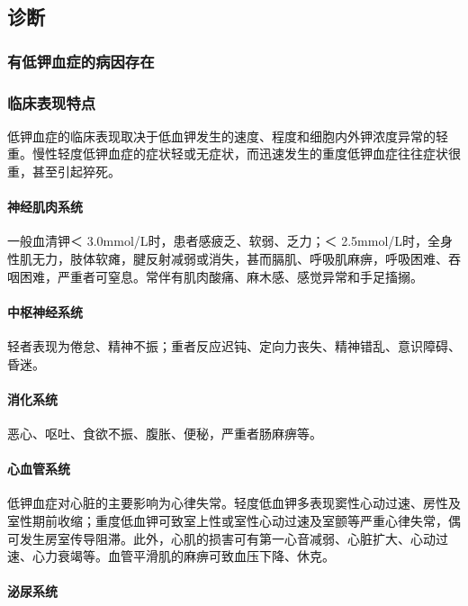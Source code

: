 \subsection{诊断}

\subsubsection{有低钾血症的病因存在}

\subsubsection{临床表现特点}

低钾血症的临床表现取决于低血钾发生的速度、程度和细胞内外钾浓度异常的轻重。慢性轻度低钾血症的症状轻或无症状，而迅速发生的重度低钾血症往往症状很重，甚至引起猝死。

\paragraph{神经肌肉系统}

一般血清钾＜ 3.0mmol/L时，患者感疲乏、软弱、乏力；＜
2.5mmol/L时，全身性肌无力，肢体软瘫，腱反射减弱或消失，甚而膈肌、呼吸肌麻痹，呼吸困难、吞咽困难，严重者可窒息。常伴有肌肉酸痛、麻木感、感觉异常和手足搐搦。

\paragraph{中枢神经系统}

轻者表现为倦怠、精神不振；重者反应迟钝、定向力丧失、精神错乱、意识障碍、昏迷。

\paragraph{消化系统}

恶心、呕吐、食欲不振、腹胀、便秘，严重者肠麻痹等。

\paragraph{心血管系统}

低钾血症对心脏的主要影响为心律失常。轻度低血钾多表现窦性心动过速、房性及室性期前收缩；重度低血钾可致室上性或室性心动过速及室颤等严重心律失常，偶可发生房室传导阻滞。此外，心肌的损害可有第一心音减弱、心脏扩大、心动过速、心力衰竭等。血管平滑肌的麻痹可致血压下降、休克。

\paragraph{泌尿系统}

